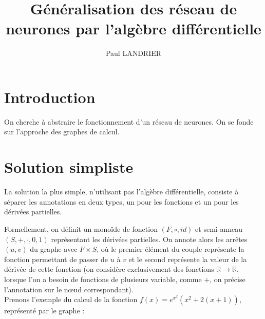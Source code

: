 \documentclass[11pt,a4paper]{article}
\author{Paul LANDRIER}
\title{Généralisation des réseau de neurones par l'algèbre différentielle}
\date{}
\newcommand{\R}{\ensuremath{\mathbb{R}}}
\begin{document}
\maketitle

\section{Introduction}

On cherche à abstraire le fonctionnement d'un réseau de neurones. On se fonde sur l'approche des graphes de calcul.

\section{Solution simpliste}

	La solution la plus simple, n'utilisant pas l'algèbre différentielle, consiste à séparer les annotations en deux types, un pour les fonctions et un pour les dérivées partielles.
	
	Formellement, on définit un monoïde de fonction $(F,\circ,id)$ et semi-anneau $(S,+,\cdot,0,1)$ représentant les dérivées partielles. On annote alors les arrêtes $(u,v)$ du graphe avec $F \times S$, où le premier élément du couple représente la fonction permettant de passer de $u$ à $v$ et le second représente la valeur de la dérivée de cette fonction (on considère exclusivement des fonctions $\R \to \R$, lorsque l'on a besoin de fonctions de plusieurs variable, comme $+$, on précise l'annotation sur le n\oe ud correspondant).\\

	Prenons l'exemple du calcul de la fonction $f(x)=e^{x^2}(x^2 + 2(x + 1))$, représenté par le graphe :\\
	
\end{document}
